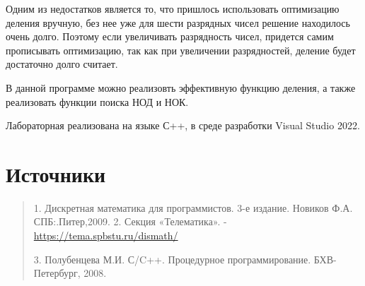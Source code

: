 \documentclass[10pt,a4paper,final]{article} %
\begin{document}
	Одним из недостатков является то, что пришлось использовать оптимизацию деления вручную, без нее уже для шести разрядных чисел решение находилось очень долго. Поэтому если увеличивать разрядность чисел, придется самим прописывать оптимизацию, так как при увеличении разрядностей, деление будет достаточно долго считает.
	
	
	В данной программе можно реализовть эффективную функцию деления, а также реализовать функции поиска НОД и НОК.
	
		Лабораторная реализована на языке С++, в среде разработки Visual Studio 2022.
	

		\newpage
		\section* {Источники}
		\begin{quote}
			1. Дискретная математика для программистов. 3-е издание. Новиков Ф.А.
			СПБ:.Питер,2009.
			2. Секция «Телематика». -\href{https://tema.spbstu.ru/dismath/}{https://tema.spbstu.ru/dismath/} 
			
			3. Полубенцева М.И. С/C++. Процедурное программирование. БХВ-Петербург, 2008. 
		\end{quote}
		
	
\end{document}
